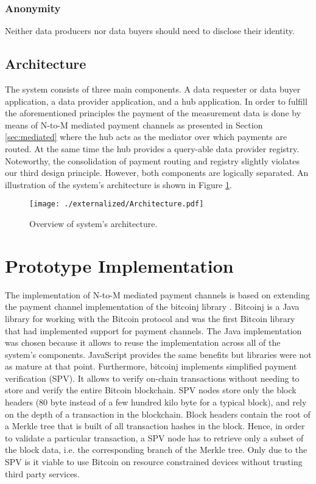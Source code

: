 \subsubsection{Anonymity}
Neither data producers nor data buyers should need to disclose their identity. 

\subsection{Architecture}
The system consists of three main components. A data requester or data buyer application, a data provider application, and a hub application. In order to fulfill the aforementioned principles the payment of the measurement data is done by means of N-to-M mediated payment channels as presented in Section \ref{sec:mediated} where the hub acts as the mediator over which payments are routed. At the same time the hub provides a query-able data provider registry. Noteworthy, the consolidation of payment routing and registry slightly violates our third design principle. However, both components are logically separated. An illustration of the system's architecture is shown in Figure \ref{fig:architecture}.


 \begin{figure}
 \texttt{[image: ./externalized/Architecture.pdf]}
 \caption{Overview of system's architecture.}
 \label{fig:architecture}
 \end{figure}

\section{Prototype Implementation}
\label{sec:implementation}

The implementation of N-to-M mediated payment channels is based on extending the payment channel implementation of the bitcoinj library \cite{Bitcoinj}. Bitcoinj is a Java library for working with the Bitcoin protocol and was the first Bitcoin library that had implemented support for payment channels. The Java implementation was chosen because it allows to reuse the implementation across all of the system's components. JavaScript provides the same benefits but libraries were not as mature at that point. Furthermore, bitcoinj implements simplified payment verification (SPV). It allows to verify on-chain transactions without needing to store and verify the entire Bitcoin blockchain. SPV nodes store only the block headers (80 byte instead of a few hundred kilo byte for a typical block), and rely on the depth of a transaction in the blockchain. Block headers contain the root of a Merkle tree that is built of all transaction hashes in the block. Hence, in order to validate a particular transaction, a SPV node has to retrieve only a subset of the block data, i.e. the corresponding branch of the Merkle tree.
Only due to the SPV is it viable to use Bitcoin on resource constrained devices without trusting third party services.

